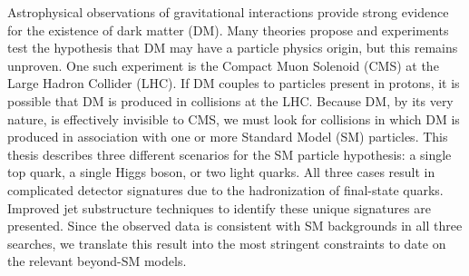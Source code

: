 % 
% 
%

Astrophysical observations of gravitational interactions provide strong evidence for the existence of dark matter (DM). 
Many theories propose and experiments test the hypothesis that DM may have a particle physics origin, but this remains unproven. 
One such experiment is the Compact Muon Solenoid (CMS) at the Large Hadron Collider (LHC). 
If DM couples to particles present in protons, it is possible that DM is produced in collisions at the LHC. 
Because DM, by its very nature, is effectively invisible to CMS, we must look for collisions in which DM is produced in association with one or more Standard Model (SM) particles. 
This thesis describes three different scenarios for the SM particle hypothesis: a single top quark, a single Higgs boson, or two light quarks. 
All three cases result in complicated detector signatures due to the hadronization of final-state quarks. 
Improved jet substructure techniques to identify these unique signatures are presented. 
Since the observed data is consistent with SM backgrounds in all three searches, we translate this result into the most stringent constraints to date on the relevant beyond-SM models.

